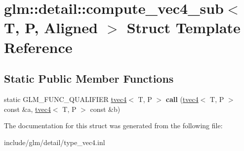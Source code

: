 \hypertarget{structglm_1_1detail_1_1compute__vec4__sub}{}\section{glm\+:\+:detail\+:\+:compute\+\_\+vec4\+\_\+sub$<$ T, P, Aligned $>$ Struct Template Reference}
\label{structglm_1_1detail_1_1compute__vec4__sub}
\subsection*{Static Public Member Functions}
\begin{DoxyCompactItemize}
\item 
\mbox{\label{structglm_1_1detail_1_1compute__vec4__sub_af5ce787235b8f9a213ab75d54edefa41}} 
static G\+L\+M\+\_\+\+F\+U\+N\+C\+\_\+\+Q\+U\+A\+L\+I\+F\+I\+ER \hyperlink{structglm_1_1tvec4}{tvec4}$<$ T, P $>$ {\bfseries call} (\hyperlink{structglm_1_1tvec4}{tvec4}$<$ T, P $>$ const \&a, \hyperlink{structglm_1_1tvec4}{tvec4}$<$ T, P $>$ const \&b)
\end{DoxyCompactItemize}


The documentation for this struct was generated from the following file\+:\begin{DoxyCompactItemize}
\item 
include/glm/detail/type\+\_\+vec4.\+inl\end{DoxyCompactItemize}
